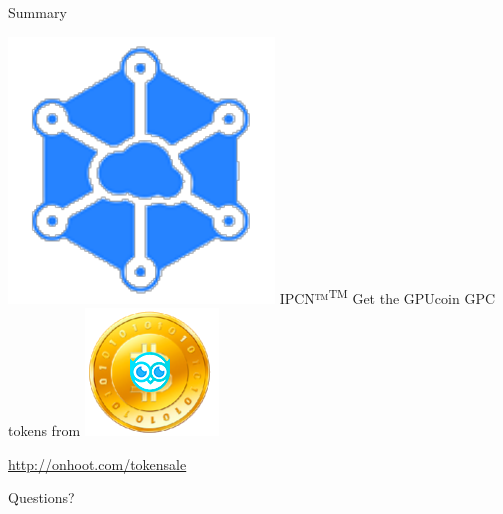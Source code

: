 \documentclass[10pt,handout]{beamer}
\begin{document}
\begin{frame}{Summary}

\includegraphics[scale=.4]{static/ipcn-p2p}
IPCN™\textsuperscript{TM} Get the GPUcoin GPC tokens from
\includegraphics[scale=0.4]{static/hootcoin} 
 \begin{center}\url{http://onhoot.com/tokensale}\end{center}




 \begin{center}\ccbysa\end{center}

\end{frame}
{%

\begin{frame}[standout]
 Questions?
\end{frame}
}%
\end{document}
